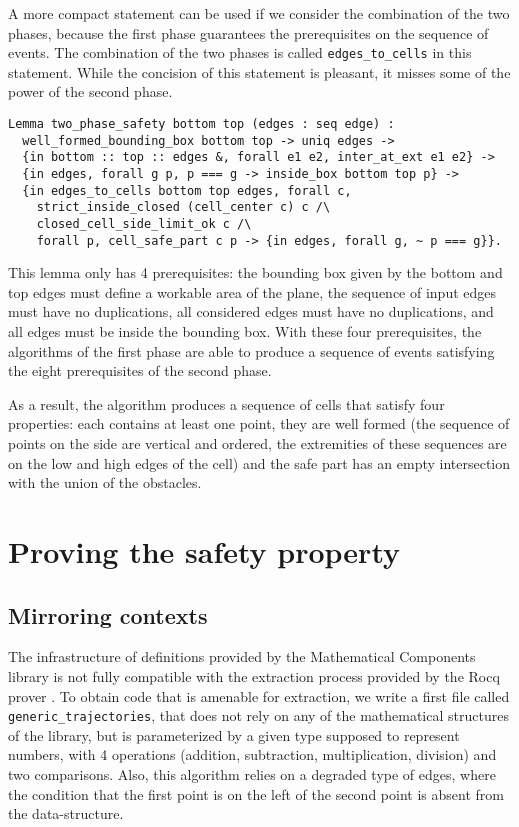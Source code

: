 \documentclass[a4paper, USenglish, cleveref, autoref, thm-restate, final]{lipics-v2021}
\begin{document}
A more compact statement can be used if we consider the combination of the
two phases, because the first phase guarantees the prerequisites on the
sequence of events.  The combination of the two phases is called
{\tt edges\_to\_cells} in this statement.
While the concision of this statement is pleasant, it
misses some of the power of the second phase.
\begin{verbatim}
Lemma two_phase_safety bottom top (edges : seq edge) :
  well_formed_bounding_box bottom top -> uniq edges ->
  {in bottom :: top :: edges &, forall e1 e2, inter_at_ext e1 e2} ->
  {in edges, forall g p, p === g -> inside_box bottom top p} ->
  {in edges_to_cells bottom top edges, forall c,
    strict_inside_closed (cell_center c) c /\
    closed_cell_side_limit_ok c /\
    forall p, cell_safe_part c p -> {in edges, forall g, ~ p === g}}.
\end{verbatim}
This lemma only has 4 prerequisites: the bounding box given by the
bottom and top edges must define a workable area of the plane, the sequence
of input edges must have no duplications, all considered edges must have
no duplications, and all edges must be inside the bounding box.  With these
four prerequisites, the algorithms of the first phase are able to produce
a sequence of events satisfying the eight prerequisites of the second phase.

As a result, the algorithm produces a sequence of cells that satisfy four
properties: each contains at least one point, they are well formed (the 
sequence of points on the side are vertical and ordered, the extremities of
these sequences are on the low and high edges of the cell) and the safe
part has an empty intersection with the union of the obstacles.

\section{Proving the safety property}
\subsection{Mirroring contexts}
The infrastructure of definitions provided by the {\sc Mathematical
Components} library is not fully compatible with the extraction
process provided by the Rocq prover \cite{letouzey:hal-00150914}.
To obtain code that is amenable for extraction, we write a
first file called {\tt generic\_trajectories}, that does not rely on
any of the mathematical structures of the library, but is
parameterized by a given type supposed to represent numbers, with 4
operations (addition, subtraction, multiplication, division) and two
comparisons.  Also, this algorithm relies on a degraded type of edges,
where the condition that the first point is on the left of the second
point is absent from the data-structure.
\end{document}

